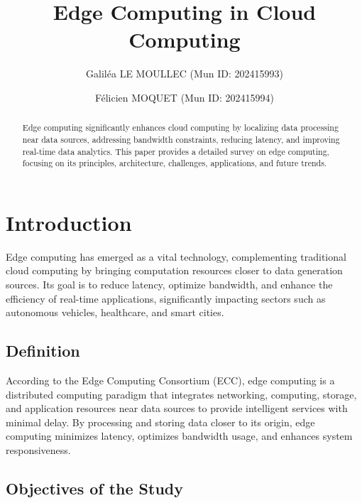 \documentclass[runningheads]{llncs}
\begin{document}
\title{Edge Computing in Cloud Computing}

\author{Galiléa LE MOULLEC (Mun ID: 202415993) \and Félicien MOQUET (Mun ID: 202415994)}

\maketitle

\begin{abstract}
Edge computing significantly enhances cloud computing by localizing data processing near data sources, addressing bandwidth constraints, reducing latency, and improving real-time data analytics. This paper provides a detailed survey on edge computing, focusing on its principles, architecture, challenges, applications, and future trends.

\end{abstract}

\section{Introduction}
Edge computing has emerged as a vital technology, complementing traditional cloud computing by bringing computation resources closer to data generation sources. Its goal is to reduce latency, optimize bandwidth, and enhance the efficiency of real-time applications, significantly impacting sectors such as autonomous vehicles, healthcare, and smart cities.

\subsection{Definition}
According to the Edge Computing Consortium (ECC), edge computing is a distributed computing paradigm that integrates networking, computing, storage, and application resources near data sources to provide intelligent services with minimal delay. By processing and storing data closer to its origin, edge computing minimizes latency, optimizes bandwidth usage, and enhances system responsiveness.



\subsection{Objectives of the Study}
\end{document}
